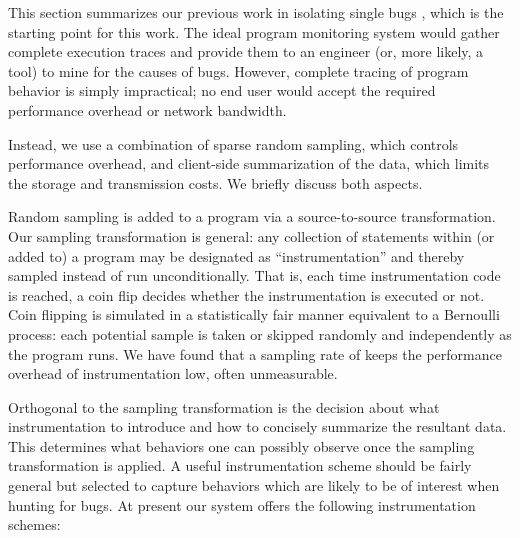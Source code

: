 \documentclass[draft]{sig-alternate}
\begin{document}
This section summarizes our previous work in isolating single bugs
\cite{PLDI`03*141,Zheng:2003:SDSP}, which is the starting point for
this work.  The ideal program monitoring system would gather complete
execution traces and provide them to an engineer (or, more likely, a
tool) to mine for the causes of bugs.  However, complete tracing of
program behavior is simply impractical; no end user would accept the
required performance overhead or network bandwidth.

Instead, we use a combination of sparse random sampling, which controls
performance overhead, and client-side summarization of the data, which
limits the storage and transmission costs.  We briefly discuss
both aspects.

Random sampling is added to a program via a source-to-source transformation.
Our sampling transformation is general: any collection of
statements within (or added to) a program may be designated as
``instrumentation'' and thereby sampled instead of run
unconditionally.  That is, each time instrumentation code is reached,
a coin flip decides whether the instrumentation is executed or not.
Coin flipping is simulated in a statistically fair
manner equivalent to a Bernoulli process: each potential sample is
taken or skipped randomly and independently as the program runs.
We have found that a sampling rate of  keeps the performance overhead
of instrumentation low, often unmeasurable.

Orthogonal to the sampling transformation is the decision about what
instrumentation to introduce and how to concisely
summarize the resultant data.  This determines what behaviors one can
possibly observe once the sampling transformation is applied.  A useful instrumentation
scheme should be fairly general but selected to capture behaviors
which are likely to be of interest when hunting for bugs.  At present
our system offers the following instrumentation schemes:
\end{document}
